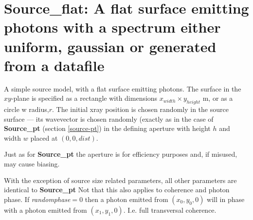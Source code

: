 \section{Source\_flat: A flat surface emitting photons with a spectrum either uniform, gaussian or generated from a datafile}
\label{source-flat}

A simple source model, with a flat surface emitting photons. The surface in the
$xy$-plane is specified as a rectangle with dimensions
$x_{width}\times y_{height}$ m, or as a circle w radius,$r$. 
The initial xray position is chosen randomly in the source surface --- its
wavevector is chosen randomly (exactly as in the case of \textbf{Source\_pt}
(section \ref{source-pt}) in the defining aperture with height $h$ and
width $w$ placed at $(0,0,dist)$. 

Just as for \textbf{Source\_pt} the aperture is for efficiency purposes and, if misused, may cause biasing.

With the exception of source size related parameters, all other parameters are identical to \textbf{Source\_pt} 
Not that this also applies to coherence and photon phase. If \textit{randomphase}$=0$ then a photon emitted from $(x_0,y_0,0)$ will in phase with a photon
emitted from $(x_1,y_1,0)$. I.e. full transversal coherence.
